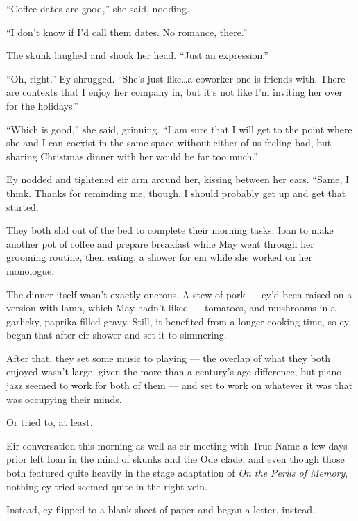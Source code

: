 ``Coffee dates are good,'' she said, nodding.

``I don't know if I'd call them dates. No romance, there.''

The skunk laughed and shook her head. ``Just an expression.''

``Oh, right.'' Ey shrugged. ``She's just like\ldots a coworker one is friends with. There are contexts that I enjoy her company in, but it's not like I'm inviting her over for the holidays.''

``Which is good,'' she said, grinning. ``I am sure that I will get to the point where she and I can coexist in the same space without either of us feeling bad, but sharing Christmas dinner with her would be far too much.''

Ey nodded and tightened eir arm around her, kissing between her ears. ``Same, I think. Thanks for reminding me, though. I should probably get up and get that started.

They both slid out of the bed to complete their morning tasks: Ioan to make another pot of coffee and prepare breakfast while May went through her grooming routine, then eating, a shower for em while she worked on her monologue.

The dinner itself wasn't exactly onerous. A stew of pork — ey'd been raised on a version with lamb, which May hadn't liked — tomatoes, and mushrooms in a garlicky, paprika-filled gravy. Still, it benefited from a longer cooking time, so ey began that after eir shower and set it to simmering.

After that, they set some music to playing — the overlap of what they both enjoyed wasn't large, given the more than a century's age difference, but piano jazz seemed to work for both of them — and set to work on whatever it was that was occupying their minds.

Or tried to, at least.

Eir conversation this morning as well as eir meeting with True Name a few days prior left Ioan in the mind of skunks and the Ode clade, and even though those both featured quite heavily in the stage adaptation of \emph{On the Perils of Memory}, nothing ey tried seemed quite in the right vein.

Instead, ey flipped to a blank sheet of paper and began a letter, instead.

